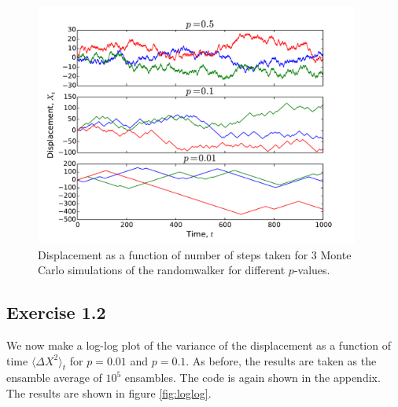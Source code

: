 \documentclass[a4paper, 11pt, notitlepage, english]{article}
\begin{document}
\begin{figure}[h]
\centering
\includegraphics[width=0.95\textwidth]{small_stock.pdf}
\caption{Displacement as a function of number of steps taken for 3 Monte Carlo simulations of the randomwalker for different $p$-values. \label{fig:walk1}}
\end{figure}



\clearpage

\subsection*{Exercise 1.2}

We now make a log-log plot of the variance of the displacement as a function of time $\langle \Delta X^2 \rangle_t$ for $p=0.01$ and $p=0.1$. As before, the results are taken as the ensamble average of $10^5$ ensambles. The code is again shown in the appendix. The results are shown in figure \ref{fig:loglog}.
\end{document}

